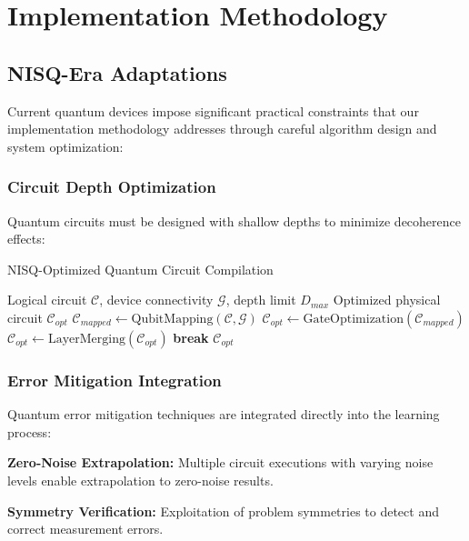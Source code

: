 \documentclass[10pt,journal,compsoc]{IEEEtran}
\begin{document}
\section{Implementation Methodology}

\subsection{NISQ-Era Adaptations}

Current quantum devices impose significant practical constraints that our implementation methodology addresses through careful algorithm design and system optimization:

\subsubsection{Circuit Depth Optimization}

Quantum circuits must be designed with shallow depths to minimize decoherence effects:

\begin{algorithm}[!t]
\caption{NISQ-Optimized Quantum Circuit Compilation}
\label{alg:circuit_optimization}
\begin{algorithmic}[1]
\Require Logical circuit $\mathcal{C}$, device connectivity $\mathcal{G}$, depth limit $D_{max}$
\Ensure Optimized physical circuit $\mathcal{C}_{opt}$
\State $\mathcal{C}_{mapped} \leftarrow \text{QubitMapping}(\mathcal{C}, \mathcal{G})$
\State $\mathcal{C}_{opt} \leftarrow \text{GateOptimization}(\mathcal{C}_{mapped})$
    \State $\mathcal{C}_{opt} \leftarrow \text{LayerMerging}(\mathcal{C}_{opt})$
        \State \textbf{break}
    \EndIf
\EndWhile
\State \Return $\mathcal{C}_{opt}$
\end{algorithmic}
\end{algorithm}

\subsubsection{Error Mitigation Integration}

Quantum error mitigation techniques are integrated directly into the learning process:

\textbf{Zero-Noise Extrapolation:} Multiple circuit executions with varying noise levels enable extrapolation to zero-noise results.

\textbf{Symmetry Verification:} Exploitation of problem symmetries to detect and correct measurement errors.
\end{document}

